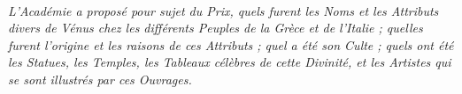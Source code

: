 \documentclass[a4paper, 18pt, oneside]{article}
\begin{document}
\setlength{\parskip}{1mm plus1mm minus1mm}
\clearpage
\Large

\paragraph{}
\emph{L'Académie a proposé pour sujet du Prix, quels furent les Noms et les Attributs divers de Vénus chez les différents Peuples de la Grèce et de l'Italie ; quelles furent l'origine et les raisons de ces Attributs ; quel a été son Culte ; quels ont été les Statues, les Temples, les Tableaux célèbres de cette Divinité, et les Artistes qui se sont illustrés par ces Ouvrages.}
\end{document}
